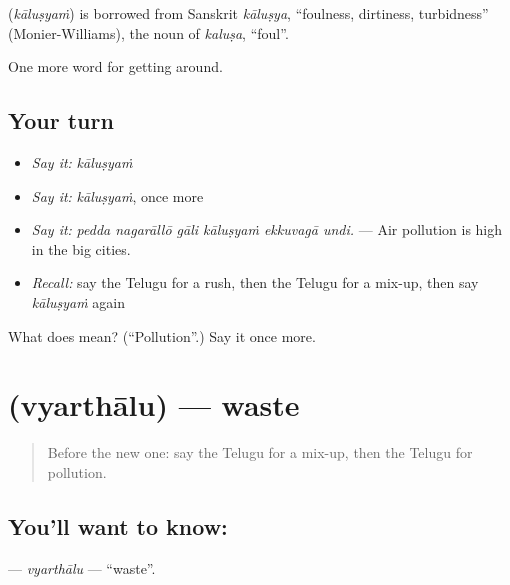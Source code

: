 \begin{cousinweb}
\textbf{} (\emph{kāluṣyaṁ}) is borrowed from Sanskrit \emph{kāluṣya}, \textquotedblleft{}foulness, dirtiness, turbidness\textquotedblright{} (Monier-Williams), the noun of \emph{kaluṣa}, \textquotedblleft{}foul\textquotedblright{}.
\end{cousinweb}

\begin{grammarlens}[title={What you've built}]
One more word for getting around.
\end{grammarlens}

\subsection*{Your turn}
\begin{itemize}
\raggedright
  \item \emph{Say it:} \emph{kāluṣyaṁ}
  \item \emph{Say it:} \emph{kāluṣyaṁ}, once more
  \item \emph{Say it:} \emph{pedda nagarāllō gāli kāluṣyaṁ ekkuvagā undi.} — Air pollution is high in the big cities.
  \item \emph{Recall:} say the Telugu for a rush, then the Telugu for a mix-up, then say \emph{kāluṣyaṁ} again
\end{itemize}

\begin{tcolorbox}[breakable,colback=teal!4,colframe=teal!35!black,title={Before you move on}]
What does  mean? (\textquotedblleft{}Pollution\textquotedblright{}.) Say it once more.
\end{tcolorbox}
\section[\texorpdfstring{\te{వ్యర్థాలు} (vyarthālu)}{వ్యర్థాలు (vyarthālu)}]{ (vyarthālu) — waste}

\label{lesson:TE-C470-vyarthalu}



\begin{quote}
Before the new one: say the Telugu for a mix-up, then the Telugu for pollution.
\end{quote}

\subsection*{You'll want to know: }
\textbf{} — \emph{vyarthālu} — \textquotedblleft{}waste\textquotedblright{}.

